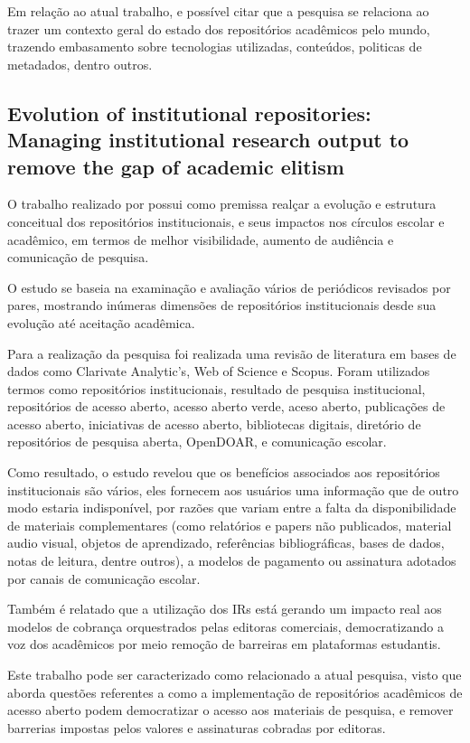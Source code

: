 Em relação ao atual trabalho, e possível citar que a pesquisa se relaciona
ao trazer um contexto geral do estado dos repositórios acadêmicos pelo
mundo, trazendo embasamento sobre tecnologias utilizadas, conteúdos, politicas
de metadados, dentro outros.

\subsection{Evolution of institutional repositories: Managing institutional research output to remove the gap of academic elitism}

O trabalho realizado por \cite{2021:Bashir} possui como premissa realçar a
evolução e estrutura conceitual dos repositórios institucionais, e seus impactos
nos círculos escolar e acadêmico, em termos de melhor visibilidade, aumento
de audiência e comunicação de pesquisa.

O estudo se baseia na examinação
e avaliação vários de periódicos revisados por pares, mostrando inúmeras
dimensões de repositórios institucionais desde sua evolução até aceitação
acadêmica.

Para a realização da pesquisa foi realizada uma revisão de literatura
em bases de dados como Clarivate Analytic’s, Web of Science e Scopus.
Foram utilizados termos como repositórios institucionais, resultado de
pesquisa institucional, repositórios de acesso aberto, acesso aberto verde,
aceso aberto, publicações de acesso aberto, iniciativas de acesso aberto,
bibliotecas digitais, diretório de repositórios de pesquisa aberta,
OpenDOAR, e comunicação escolar.

Como resultado, o estudo revelou que os benefícios associados aos
repositórios institucionais são vários, eles fornecem aos usuários
uma informação que de outro modo estaria indisponível, por razões que
variam entre a falta da disponibilidade de materiais complementares
(como relatórios e papers não publicados, material audio visual,
objetos de aprendizado, referências bibliográficas, bases de dados,
notas de leitura, dentre outros), a modelos de pagamento ou assinatura
adotados por canais de comunicação escolar.

Também é relatado que a utilização dos IRs está gerando um impacto real
aos modelos de cobrança orquestrados pelas editoras comerciais,
democratizando a voz dos acadêmicos por meio remoção de barreiras
em plataformas estudantis.

Este trabalho pode ser caracterizado como relacionado a atual pesquisa,
visto que aborda questões referentes a como a implementação de repositórios
acadêmicos de acesso aberto podem democratizar o acesso aos materiais de
pesquisa, e remover barrerias impostas pelos valores e assinaturas
cobradas por editoras.


